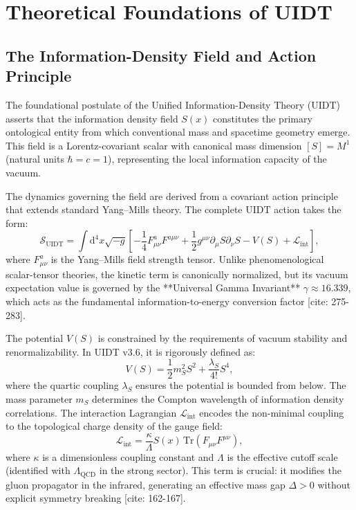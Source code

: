 
\section{Theoretical Foundations of UIDT}
\label{sec:theory}

\subsection{The Information-Density Field and Action Principle}
\label{subsec:field}

The foundational postulate of the Unified Information-Density Theory (UIDT) asserts that the information density field $S(x)$ constitutes the primary ontological entity from which conventional mass and spacetime geometry emerge. This field is a Lorentz-covariant scalar with canonical mass dimension $[S] = M^1$ (natural units $\hbar = c = 1$), representing the local information capacity of the vacuum.

The dynamics governing the field are derived from a covariant action principle that extends standard Yang--Mills theory. The complete UIDT action takes the form:
\begin{equation}
\label{eq:action}
\mathcal{S}_{\mathrm{UIDT}} = \int \mathrm{d}^4x \sqrt{-g} \left[ -\frac{1}{4}F_{\mu\nu}^a F^{a\mu\nu} + \frac{1}{2}g^{\mu\nu} \partial_\mu S \partial_\nu S - V(S) + \mathcal{L}_{\mathrm{int}} \right],
\end{equation}
where $F_{\mu\nu}^a$ is the Yang--Mills field strength tensor. Unlike phenomenological scalar-tensor theories, the kinetic term is canonically normalized, but its vacuum expectation value is governed by the **Universal Gamma Invariant** $\gamma \approx 16.339$, which acts as the fundamental information-to-energy conversion factor [cite: 275-283].

The potential $V(S)$ is constrained by the requirements of vacuum stability and renormalizability. In UIDT v3.6, it is rigorously defined as:
\begin{equation}
\label{eq:potential}
V(S) = \frac{1}{2} m_S^2 S^2 + \frac{\lambda_S}{4!} S^4,
\end{equation}
where the quartic coupling $\lambda_S$ ensures the potential is bounded from below. The mass parameter $m_S$ determines the Compton wavelength of information density correlations. The interaction Lagrangian $\mathcal{L}_{\mathrm{int}}$ encodes the non-minimal coupling to the topological charge density of the gauge field:
\begin{equation}
\label{eq:interaction}
\mathcal{L}_{\mathrm{int}} = \frac{\kappa}{\Lambda} S(x)\, \mathrm{Tr}(F_{\mu\nu} F^{\mu\nu}),
\end{equation}
where $\kappa$ is a dimensionless coupling constant and $\Lambda$ is the effective cutoff scale (identified with $\Lambda_{\mathrm{QCD}}$ in the strong sector). This term is crucial: it modifies the gluon propagator in the infrared, generating an effective mass gap $\Delta > 0$ without explicit symmetry breaking [cite: 162-167].

